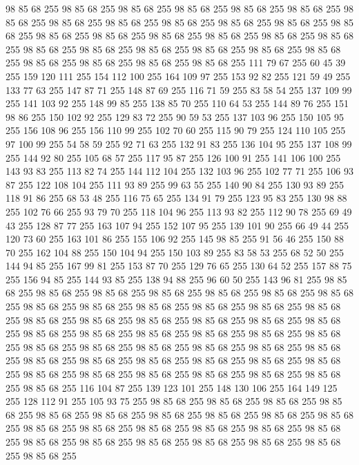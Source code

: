 98 85 68 255 98 85 68 255 98 85 68 255 98 85 68 255 98 85 68 255 98 85 68 255 98 85 68 255 98 85 68 255 98 85 68 255 98 85 68 255 98 85 68 255 98 85 68 255 98 85 68 255 98 85 68 255 98 85 68 255 98 85 68 255 98 85 68 255 98 85 68 255 98 85 68 255 98 85 68 255 98 85 68 255 98 85 68 255 98 85 68 255 98 85 68 255 98 85 68 255 98 85 68 255 98 85 68 255 98 85 68 255 98 85 68 255 111 79 67 255 60 45 39 255 159 120 111 255 154 112 100 255 164 109 97 255 153 92 82 255 121 59 49 255 133 77 63 255 147 87 71 255 148 87 69 255 116 71 59 255 83 58 54 255 137 109 99 255 141 103 92 255 148 99 85 255 138 85 70 255 110 64 53 255 144 89 76 255 151 98 86 255 150 102 92 255 129 83 72 255 90 59 53 255 137 103 96 255 150 105 95 255 156 108 96 255 156 110 99 255 102 70 60 255 115 90 79 255 124 110 105 255 97 100 99 255 54 58 59 255 92 71 63 255 132 91 83 255 136 104 95 255 137 108 99 255
144 92 80 255 105 68 57 255 117 95 87 255 126 100 91 255 141 106 100 255 143 93 83 255 113 82 74 255 144 112 104 255 132 103 96 255 102 77 71 255 106 93 87 255 122 108 104 255 111 93 89 255 99 63 55 255 140 90 84 255 130 93 89 255 118 91 86 255 68 53 48 255 116 75 65 255 134 91 79 255 123 95 83 255 130 98 88 255 102 76 66 255 93 79 70 255 118 104 96 255 113 93 82 255 112 90 78 255 69 49 43 255 128 87 77 255 163 107 94 255 152 107 95 255 139 101 90 255 66 49 44 255 120 73 60 255 163 101 86 255 155 106 92 255 145 98 85 255 91 56 46 255 150 88 70 255 162 104 88 255 150 104 94 255 150 103 89 255 83 58 53 255 68 52 50 255 144 94 85 255 167 99 81 255 153 87 70 255 129 76 65 255 130 64 52 255 157 88 75 255 156 94 85 255 144 93 85 255 138 94 88 255 96 60 50 255 143 96 81 255 98 85 68 255 98 85 68 255 98 85 68 255 98 85 68 255 98 85 68 255 98 85 68 255 98 85 68 255 98 85 68 255 98 85 68 255
98 85 68 255 98 85 68 255 98 85 68 255 98 85 68 255 98 85 68 255 98 85 68 255 98 85 68 255 98 85 68 255 98 85 68 255 98 85 68 255 98 85 68 255 98 85 68 255 98 85 68 255 98 85 68 255 98 85 68 255 98 85 68 255 98 85 68 255 98 85 68 255 98 85 68 255 98 85 68 255 98 85 68 255 98 85 68 255 98 85 68 255 98 85 68 255 98 85 68 255 98 85 68 255 98 85 68 255 98 85 68 255 98 85 68 255 98 85 68 255 98 85 68 255 98 85 68 255 98 85 68 255 98 85 68 255 98 85 68 255 116 104 87 255 139 123 101 255 148 130 106 255 164 149 125 255 128 112 91 255 105 93 75 255 98 85 68 255 98 85 68 255 98 85 68 255 98 85 68 255 98 85 68 255 98 85 68 255 98 85 68 255 98 85 68 255 98 85 68 255 98 85 68 255 98 85 68 255 98 85 68 255 98 85 68 255 98 85 68 255 98 85 68 255 98 85 68 255 98 85 68 255 98 85 68 255 98 85 68 255 98 85 68 255 98 85 68 255 98 85 68 255 98 85 68 255
